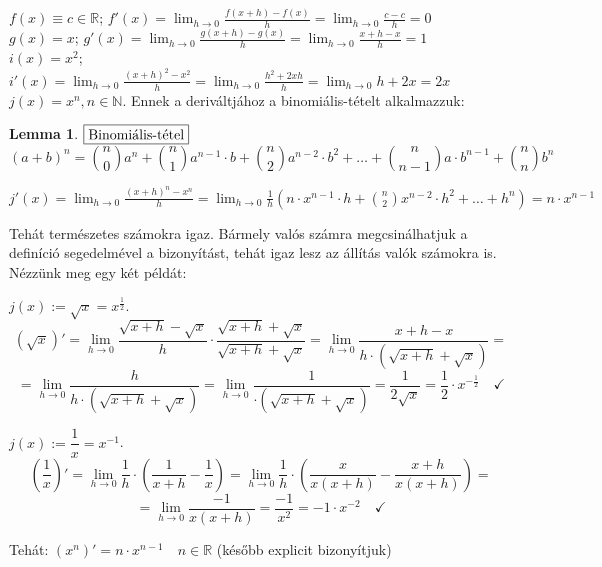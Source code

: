 \documentclass[a4paper,12pt,twoside]{book}
\newtheorem{lemma}{Lemma}[chapter]
\theoremstyle{break}
\theoremstyle{plain}
\begin{document}
$f(x)\equiv c \in\mathbb{R}$; $f'(x)= \displaystyle \lim_{h\to 0} \frac{f(x+h)-f(x)}{h} = \lim_{h\to 0} \frac{c-c}{h} = 0$\\

$g(x)=x$; $g'(x) = \displaystyle \lim_{h\to 0} \frac{g(x+h)-g(x)}{h} = \lim_{h\to 0} \frac{x+h-x}{h} = 1$\\

$i(x)=x^2$; $i'(x) = \displaystyle \lim_{h\to 0} \frac{(x+h)^2-x^2}{h} = \lim_{h\to 0} \frac{h^2+2xh}{h} = \lim_{h\to 0} h+2x = 2x$\\

$j(x)=x^n, n\in\mathbb{N}$. Ennek a deriváltjához a binomiális-tételt alkalmazzuk:

\begin{lemma} $\boxed{$Binomiális-tétel$}$
\[(a+b)^n = \binom{n}{0}a^n + \binom{n}{1}a^{n-1}\cdot b + \binom{n}{2}a^{n-2}\cdot b^2 + \ldots + \binom{n}{n-1}a\cdot b^{n-1} + \binom{n}{n}b^n\]
\end{lemma}

$j'(x) = \displaystyle \lim_{h\to 0} \frac{(x+h)^n-x^n}{h}=\lim_{h\to 0} \frac{1}{h}\left( n\cdot x^{n-1}\cdot h + \binom{n}{2}x^{n-2}\cdot h^2 + \ldots + h^n \right) = n\cdot x^{n-1}$

Tehát természetes számokra igaz. Bármely valós számra megcsinálhatjuk a definíció segedelmével a bizonyítást, tehát igaz lesz az állítás valók számokra is. Nézzünk meg egy két példát:

$j(x) := \sqrt{x} = x^{\frac{1}{2}}$.
\[(\sqrt{x})' = \lim_{h\to 0} \frac{\sqrt{x+h}-\sqrt{x}}{h}\cdot\frac{\sqrt{x+h}+\sqrt{x}}{\sqrt{x+h}+\sqrt{x}} = \lim_{h\to 0} \frac{x+h-x}{h\cdot (\sqrt{x+h}+\sqrt{x})} = \]
\[= \lim_{h\to 0} \frac{h}{h\cdot (\sqrt{x+h}+\sqrt{x})} = \lim_{h\to 0} \frac{1}{\cdot (\sqrt{x+h}+\sqrt{x})} = \frac{1}{2\sqrt{x}} = \frac{1}{2} \cdot x^{-\frac{1}{2}} \quad \checkmark\]

$j(x) := \dfrac{1}{x} = x^{-1}$.
\[\left(\frac{1}{x}\right)' = \lim_{h\to 0} \frac{1}{h}\cdot\left(\frac{1}{x+h}-\frac{1}{x}\right) = \lim_{h\to 0} \frac{1}{h}\cdot\left(\frac{x}{x(x+h)}-\frac{x+h}{x(x+h)}\right) =\]
\[ = \lim_{h\to 0} \frac{-1}{x(x+h)} = \frac{-1}{x^2} = -1\cdot x^{-2} \quad \checkmark\]

Tehát: $\boxed{(x^n)' = n\cdot x^{n-1} \quad n\in\mathbb{R}}$ (később explicit bizonyítjuk)
\end{document}
